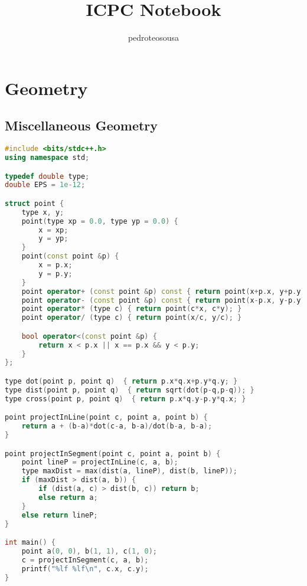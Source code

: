 \documentclass{article}
\title{ICPC Notebook}
\author{pedroteosousa }
\date{}
\begin{document}
\maketitle
\tableofcontents

\section{Geometry}
\subsection{Miscellaneous Geometry}
\begin{lstlisting}[language=C++]
#include <bits/stdc++.h>
using namespace std;

typedef double type;
double EPS = 1e-12;

struct point {
    type x, y;
    point(type xp = 0.0, type yp = 0.0) {
        x = xp;
        y = yp;
    }
    point(const point &p) {
        x = p.x;
        y = p.y;
    }
    point operator+ (const point &p) const { return point(x+p.x, y+p.y); }
    point operator- (const point &p) const { return point(x-p.x, y-p.y); }
    point operator* (type c) { return point(c*x, c*y); }
    point operator/ (type c) { return point(x/c, y/c); }

    bool operator<(const point &p) {
		return x < p.x || x == p.x && y < p.y;
	}
};

type dot(point p, point q)  { return p.x*q.x+p.y*q.y; }
type dist(point p, point q)  { return sqrt(dot(p-q,p-q)); }
type cross(point p, point q)  { return p.x*q.y-p.y*q.x; }

point projectInLine(point c, point a, point b) {
	return a + (b-a)*dot(c-a, b-a)/dot(b-a, b-a);
}

point projectInSegment(point c, point a, point b) {
    point lineP = projectInLine(c, a, b);
    type maxDist = max(dist(a, lineP), dist(b, lineP));
    if (maxDist > dist(a, b)) {
        if (dist(a, c) > dist(b, c)) return b;
        else return a;
    }
    else return lineP;
}

int main() {
	point a(0, 0), b(1, 1), c(1, 0);
	c = projectInSegment(c, a, b);
	printf("%lf %lf\n", c.x, c.y);
}
\end{lstlisting}
\end{document}
